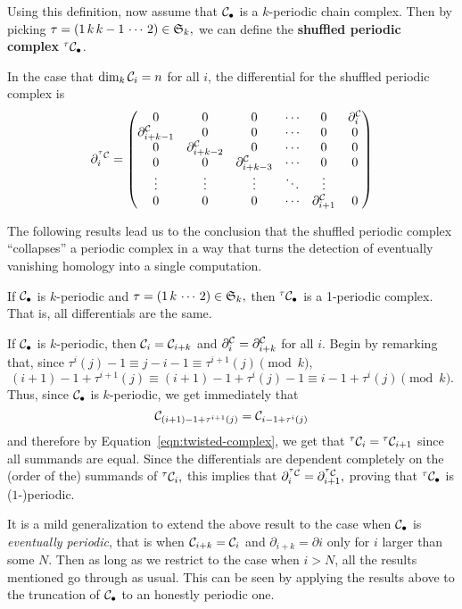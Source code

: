 \documentclass [11pt, proquest] {uwthesis}[2020/02/24]
\begin{document}
    Using this definition, now assume that $\mathcal{C}_\bullet$ is a $k$-periodic chain complex. Then by picking $\tau=(1\,k\,k-1\,\cdots\,2)\in\mathfrak{S}_k,$ we can define the \textbf{shuffled periodic complex} $^\tau\mathcal{C}_\bullet$.
    \begin{rmk}
        In the case that $\dim_k \mathcal{C}_i=n$ for all $i$, the differential for the shuffled periodic complex is
    \[\partial^{^\tau\mathcal{C}}_i=\begin{pmatrix}
    0 & 0 & 0 & \cdots &0& \partial^{\mathcal{C}}_{i}\\
    \partial^{\mathcal{C}}_{i+k-1} & 0 & 0 & \cdots &0& 0\\
    0&\partial^{\mathcal{C}}_{i+k-2}& 0 & \cdots &0& 0\\
    0 & 0 &\partial^{\mathcal{C}}_{i+k-3}& \cdots &0& 0\\
    \vdots &\vdots & \vdots & \ddots & \vdots\\
    0 & 0 & 0 & \cdots & \partial^{\mathcal{C}}_{i+1} & 0
    \end{pmatrix}\]
    \end{rmk}
    
    The following results lead us to the conclusion that the shuffled periodic complex ``collapses'' a periodic complex in a way that turns the detection of eventually vanishing homology into a single computation. 
    \begin{prop}\label{prop:periodic}
        If $\mathcal{C}_\bullet$ is $k$-periodic and $\tau=(1\,k\,\cdots\, 2)\in\mathfrak{S}_k,$ then $^\tau\mathcal{C}_\bullet$ is a 1-periodic complex. That is, all differentials are the same.
    \end{prop}
    \begin{prf}
        If $\mathcal{C}_\bullet$ is $k$-periodic, then $\mathcal{C}_i=\mathcal{C}_{i+k}$ and $\partial^{\mathcal{C}}_i=\partial^{\mathcal{C}}_{i+k}$ for all $i$. Begin by remarking that, since $\tau^i(j)-1\equiv j-i-1\equiv\tau^{i+1}(j)\pmod{k},$
        \[(i+1)-1+\tau^{i+1}(j)\equiv(i+1)-1+\tau^i(j)-1\equiv i-1+\tau^i(j)\pmod{k}.\]
        Thus, since $\mathcal{C}_\bullet$ is $k$-periodic, we get immediately that
        \[\mathcal{C}_{(i+1)-1+\tau^{i+1}(j)}=\mathcal{C}_{i-1+\tau^i(j)}\]
        and therefore by Equation~\ref{eqn:twisted-complex}, we get that $^\tau\mathcal{C}_i={^\tau\mathcal{C}_{i+1}}$ since all summands are equal. Since the differentials are dependent completely on the (order of the) summands of $^\tau\mathcal{C}_i,$ this implies that $\partial^{^\tau\mathcal{C}}_i=\partial^{^\tau\mathcal{C}}_{i+1},$ proving that $^\tau\mathcal{C}_\bullet$ is ($1$-)periodic.
    \end{prf}
    \begin{rmk}
        It is a mild generalization to extend the above result to the case when $\mathcal{C}_\bullet$ is \textit{eventually periodic}, that is when $\mathcal{C}_{i+k}=\mathcal{C}_i$ and $\partial_{i+k}=\partial i$ only for $i$ larger than some $N$. Then as long as we restrict to the case when $i>N$, all the results mentioned go through as usual. This can be seen by applying the results above to the truncation of $\mathcal{C}_\bullet$ to an honestly periodic one.
    \end{rmk}
    
\end{document}
